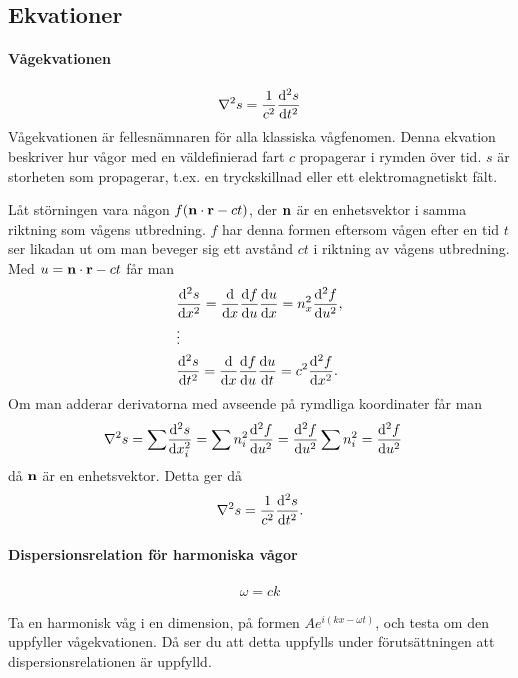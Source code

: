 \subsection{Ekvationer}

\paragraph{Vågekvationen}
\begin{align*}
	\laplacian{s} = \frac{1}{c^2}\dv[2]{s}{t}
\end{align*}
Vågekvationen är fellesnämnaren för alla klassiska vågfenomen. Denna ekvation beskriver hur vågor med en väldefinierad fart $c$ propagerar i rymden över tid. $s$ är storheten som propagerar, t.ex. en tryckskillnad eller ett elektromagnetiskt fält.

\deriv
Låt störningen vara någon $f(\vect{n}\cdot\vect{r} - ct)$, der $\vect{n}$ är en enhetsvektor i samma riktning som vågens utbredning. $f$ har denna formen eftersom vågen efter en tid $t$ ser likadan ut om man beveger sig ett avstånd $ct$ i riktning av vågens utbredning. Med $u = \vect{n}\cdot\vect{r} - ct$ får man
\begin{align*}
	&\dv[2]{s}{x} = \dv{}{x}\dv{f}{u}\dv{u}{x} = n_x^2\dv[2]{f}{u}, \\
	&\vdots \\
	&\dv[2]{s}{t} = \dv{}{x}\dv{f}{u}\dv{u}{t} = c^2\dv[2]{f}{x}.
\end{align*}
Om man adderar derivatorna med avseende på rymdliga koordinater får man
\begin{align*}
	\laplacian{s} = \sum &\dv[2]{s}{x_i} = \sum n_i^2\dv[2]{f}{u} = \dv[2]{f}{u}\sum n_i^2 = \dv[2]{f}{u}
\end{align*}
då $\vect{n}$ är en enhetsvektor. Detta ger då
\begin{align*}
	\laplacian{s} = \frac{1}{c^2}\dv[2]{s}{t}.
\end{align*}

\paragraph{Dispersionsrelation för harmoniska vågor}
\begin{align*}
	\omega = ck
\end{align*}

\deriv
Ta en harmonisk våg i en dimension, på formen $Ae^{i(kx - \omega t)}$, och testa om den uppfyller vågekvationen. Då ser du att detta uppfylls under förutsättningen att dispersionsrelationen är uppfylld.

